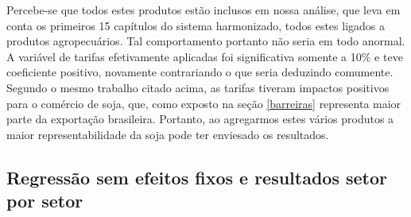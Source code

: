 \documentclass[12pt, a4paper]{article}
\begin{document}
Percebe-se que todos estes produtos estão inclusos em nossa análise, que leva em conta os primeiros 15 capítulos do sistema harmonizado, todos estes ligados a produtos agropecuários. Tal comportamento portanto não seria em todo anormal. A variável de tarifas efetivamente aplicadas foi significativa somente a 10\% e teve coeficiente positivo, novamente contrariando o que seria deduzindo comumente. Segundo o mesmo trabalho citado acima, as tarifas tiveram impactos positivos para o comércio de soja, que, como exposto na seção \ref{barreiras} representa maior parte da exportação brasileira. Portanto, ao agregarmos estes vários produtos a maior representabilidade da soja pode ter enviesado os resultados.

\subsection{Regressão sem efeitos fixos e resultados setor por setor}





\printbibliography
\end{document}
